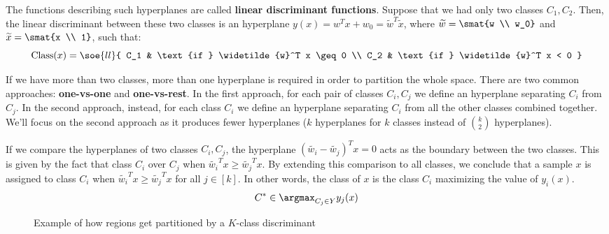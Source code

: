 \documentclass[a4paper, 12pt]{report}
\begin{document}
    The functions describing such hyperplanes are called \textbf{linear discriminant functions}. Suppose that we had only two classes $C_1, C_2$. Then, the linear discriminant between these two classes is an hyperplane $y(x) = w^Tx + w_0 = \widetilde{w}^T \widetilde{x}$, where $\widetilde{w} = \smat{w \\ w_0}$ and $\widetilde{x} = \smat{x \\ 1}$, such that:
    \[\mathrm{Class}(x) = \soe{ll}{
        C_1 & \text{if } \widetilde{w}^T x \geq 0 \\
        C_2 & \text{if } \widetilde{w}^T x < 0
    }\]
    
    If we have more than two classes, more than one hyperplane is required in order to partition the whole space. There are two common approaches: \textbf{one-vs-one} and \textbf{one-vs-rest}. In the first approach, for each pair of classes $C_i, C_j$ we define an hyperplane separating $C_i$ from $C_j$. In the second approach, instead, for each class $C_i$ we define an hyperplane separating $C_i$ from all the other classes combined together. We'll focus on the second approach as it produces fewer hyperplanes ($k$ hyperplanes for $k$ classes instead of $\binom{k}{2}$ hyperplanes).

    If we compare the hyperplanes of two classes $C_i, C_j$, the hyperplane $(\widetilde{w_i} - \widetilde{w_j})^T x = 0$ acts as the boundary between the two classes. This is given by the fact that class $C_i$  over $C_j$ when $\widetilde{w_i}^T x \geq \widetilde{w_j}^Tx$. By extending this comparison to all classes, we conclude that a sample $x$ is assigned to class $C_i$ when $\widetilde{w_i}^T x \geq \widetilde{w_j}^Tx$ for all $j \in [k]$. In other words, the class of $x$ is the class $C_i$  maximizing the value of $y_i(x)$.
    \[C^* \in \argmax_{C_j \in Y} y_j(x)\]

    \begin{figure}[H]
        \centering

        \caption{Example of how regions get partitioned by a $K$-class discriminant}
    \end{figure}
\end{document}
